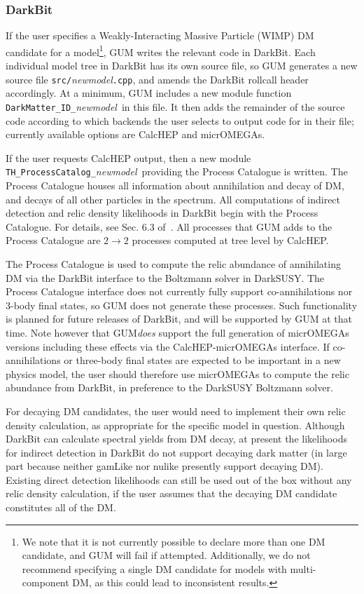 \documentclass[pdftex,twocolumn,epjc3_preprint,runningheads]{svjour3}
\renewcommand{\_}{\discretionary{\underscore}{}{\underscore}}
\newcommand\cpp[1]{{\lstinline!#1!}}  %
\newcommand\term[1]{{\lstset{style=terminal}\lstinline!#1!\lstset{style=cpp}}}
\newcommand{\metavarf}[1]{\textit{\color{darkgreen}\footnotesize\textrm{#1}}}
\newcommand{\metavar}{\metavarf}
\newcommand{\darkbit}{\textsf{DarkBit}\xspace}
\newcommand{\ds}{\textsf{DarkSUSY}\xspace}
\newcommand{\mo}{\micromegas}
\newcommand{\micromegas}{\textsf{micrOMEGAs}\xspace}
\newcommand\nulike{\textsf{nulike}\xspace}
\newcommand\gamLike{\textsf{gamLike}\xspace}
\newcommand\gamlike{\gamLike}
\newcommand{\gum}{\textsf{GUM}\xspace}
\newcommand{\dgum}{\!\!\term{.gum}\!\xspace}
\newcommand{\CH}{\textsf{CalcHEP}\xspace}
\newcommand{\nm}{\metavar{new\_model}}
\begin{document}
\subsubsection{\darkbit}

If the user specifies a Weakly-Interacting Massive Particle (WIMP) DM candidate for a model\footnote{We note that it is not currently possible to declare more than one DM candidate, and \gum will fail if attempted. Additionally, we do not recommend specifying a single DM candidate for models with multi-component DM, as this could lead to inconsistent results.}, \gum writes the relevant code in \darkbit. Each individual model tree in \darkbit has its own source file, so \gum generates a new source file \term{src/}\nm\term{.cpp}, and amends the \darkbit rollcall header accordingly. At a minimum, \gum includes a new module function \cpp{DarkMatter_ID_}\nm\ in this file. It then adds the remainder of the source code according to which backends the user selects to output code for in their \dgum file; currently available options are \CH and \mo.

If the user requests \CH output, then a new module \cpp{TH_ProcessCatalog_}\nm\ providing the Process Catalogue is written.  The Process Catalogue houses all information about annihilation and decay of DM, and decays of all other particles in the spectrum.  All computations of indirect detection and relic density likelihoods in \darkbit begin with the Process Catalogue. For details, see Sec. 6.3 of~\cite{DarkBit}. All processes that \gum adds to the Process Catalogue are $2\to2$ processes computed at tree level by \CH.

The Process Catalogue is used to compute the relic abundance of annihilating DM via the \darkbit interface to the Boltzmann solver in \ds.  The Process Catalogue interface does not currently fully support co-annihilations nor 3-body final states, so \gum does not generate these processes. Such functionality is planned for future releases of \darkbit, and will be supported by \gum at that time.  Note however that \gum \textit{does} support the full generation of \mo versions including these effects via the \CH-\mo interface. If co-annihilations or three-body final states are expected to be important in a new physics model, the user should therefore use \mo to compute the relic abundance from \darkbit, in preference to the \ds Boltzmann solver.

For decaying DM candidates, the user would need to implement their own relic density calculation, as appropriate for the specific model in question.  Although \darkbit can calculate spectral yields from DM decay, at present the likelihoods for indirect detection in \darkbit do not support decaying dark matter (in large part because neither \gamlike nor \nulike presently support decaying DM).  Existing direct detection likelihoods can still be used out of the box without any relic density calculation, if the user assumes that the decaying DM candidate constitutes all of the DM.
\end{document}
